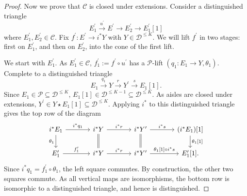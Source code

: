 \documentclass[11pt]{amsart}
\theoremstyle{plain}
\theoremstyle{definition}
\numberwithin{equation}{section}
\numberwithin{theorem}{section}
\begin{document}
\begin{proof}
    Now we prove that $\mathcal{C}$ is closed under extensions.
    Consider a distinguished triangle
    \begin{displaymath}
        E^\prime_1\xrightarrow{u^\prime} E^\prime\to E^\prime_2\to E^\prime_1[1]
    \end{displaymath}
    where $E^\prime_1,E^\prime_2\in \mathcal{C}$.
    Fix $f^\prime\colon E^\prime\to i^\ast Y$ with $Y\in \mathcal{D}^{\leq K}$.
    We will lift $f^\prime$ in two stages: first on $E^\prime_1$, and then on $E^\prime_2$, into the cone of the first lift.

    We start with $E^\prime_1$.
    As $E^\prime_1\in \mathcal{C}$, $f^\prime_1 := f^\prime\circ u^\prime$ has a $\mathcal{P}$-lift $(q_1\colon E_1\to Y,\theta_1)$.
    Complete to a distinguished triangle
    \begin{displaymath}
        E_1\xrightarrow{q_1} Y\xrightarrow{r} Y^\prime\xrightarrow{s} E_1[1].
    \end{displaymath}
    Since $E_1\in \mathcal{P} \subseteq \mathcal{D}^{\leq K}$, $E_1[1]\in \mathcal{D}^{\leq K-1}\subseteq \mathcal{D}^{\leq K}$.
    As aisles are closed under extensions, $Y^\prime\in Y\star E_1[1]\subseteq \mathcal{D}^{\leq K}$.
    Applying $i^\ast$ to this distinguished triangle gives the top row of the diagram
    \begin{displaymath}
        \begin{tikzcd}[column sep=large]
            i^\ast E_1 \ar[r, "i^\ast q_1"] \ar[d, "\theta_1"'] & i^\ast Y \ar[r, "i^\ast r"] \ar[d, equal] & i^\ast Y^\prime \ar[r, "i^\ast s"] \ar[d, equal] & (i^\ast E_1)[1] \ar[d, "{\theta_1[1]}"] \\
            E^\prime_1 \ar[r, "f^\prime_1"] & i^\ast Y \ar[r, "i^\ast r"] & i^\ast Y^\prime \ar[r, "{\theta_1[1]\circ i^\ast s}"] & E^\prime_1[1].
        \end{tikzcd}
    \end{displaymath}
    Since $i^\ast q_1 = f^\prime_1\circ \theta_1$, the left square commutes.
    By construction, the other two squares commute.
    As all vertical maps are isomorphisms, the bottom row is isomorphic to a distinguished triangle, and hence is distinguished.


\end{proof}
\end{document}
